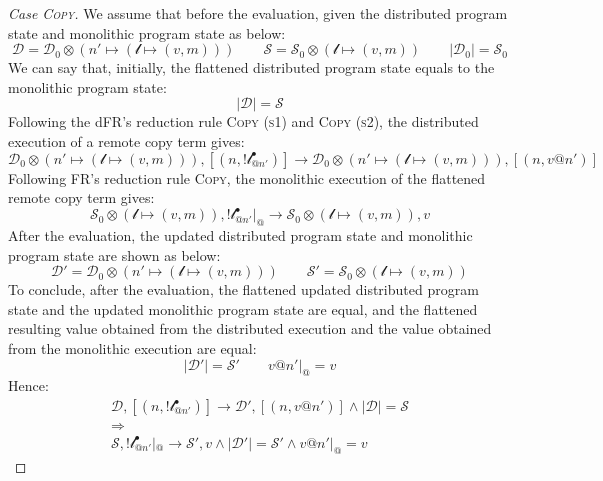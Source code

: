 \begin{proof}[Case \textsc{\emph{Copy}}]
We assume that before the evaluation, given the distributed program state and monolithic program state as below:
\[\mathcal{D} = \mathcal{D}_0 \otimes (n' \mapsto (\mathscr{l}\mapsto (v, m)))\quad\quad
\mathcal{S} = \mathcal{S}_0 \otimes (\mathscr{l} \mapsto (v, m)) \quad\quad |\mathcal{D}_0| = \mathcal{S}_0\]
We can say that, initially, the flattened distributed program state equals to the monolithic program state: 
\[|\mathcal{D}| = \mathcal{S}\]
Following the dFR's reduction rule \textsc{Copy (s1)} and \textsc{Copy (s2)}, the distributed execution of a remote copy term gives:
\[\mathcal{D}_0 \otimes (n' \mapsto (\mathscr{l} \mapsto (v,m))) , [(n, !\mathscr{l}^\bullet_{@n'})] \longrightarrow \mathcal{D}_0 \otimes (n' \mapsto (\mathscr{l} \mapsto (v, m))), [(n, v@n')]\]
Following FR's reduction rule \textsc{Copy}, the monolithic execution of the flattened remote copy term gives:
\[\mathcal{S}_0 \otimes (\mathscr{l} \mapsto (v, m)), !\mathscr{l}^\bullet_{@n'}|_@ \longrightarrow \mathcal{S}_0 \otimes (\mathscr{l} \mapsto (v, m)), v\]
After the evaluation, the updated distributed program state and monolithic program state are shown as below:
\[\mathcal{D}' = \mathcal{D}_0 \otimes (n' \mapsto (\mathscr{l} \mapsto (v, m))) \quad\quad 
\mathcal{S}' = \mathcal{S}_0 \otimes (\mathscr{l} \mapsto (v, m))\]
To conclude, after the evaluation, the flattened updated distributed program state and the updated monolithic program state are equal, and the flattened resulting value obtained from the distributed execution and the value obtained from the monolithic execution are equal:
\[
|\mathcal{D}'| = \mathcal{S}' \quad\quad v@n'|_@ = v
\]
Hence:
\begin{gather*}
\mathcal{D}, [(n, !\mathscr{l}^\bullet_{@n'})] \longrightarrow \mathcal{D'}, [(n, v@n')] \land |\mathcal{D}| = \mathcal{S} \\\Rightarrow\\ \mathcal{S},  !\mathscr{l}^\bullet_{@n'}|_@ \longrightarrow \mathcal{S'}, v \land |\mathcal{D}'| = \mathcal{S}' \land v@n'|_@ = v
\end{gather*}



\end{proof}
